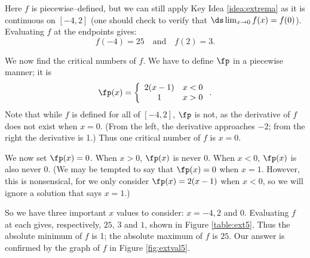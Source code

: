 {Here $f$ is piecewise--defined, but we can still apply Key Idea \ref{idea:extrema} as it is continuous on $[-4,2]$ (one should check to verify that $\ds\lim_{x\to0}f(x) =f(0)$). Evaluating $f$ at the endpoints gives: 
$$ f(-4) = 25 \quad \text{and} \quad f(2) = 3.$$

We now find the critical numbers of $f$. We have to define $\fp$ in a piecewise manner; it is $$\fp(x) =\left\{\begin{array}{cc} 2(x-1) & x < 0 \\ 1 & x>0 \end{array}\right. .$$ Note that while $f$ is defined for all of $[-4,2]$, $\fp$ is not, as the derivative of $f$ does not exist when $x=0$. (From the left, the derivative approaches $-2$; from the right the derivative is 1.) Thus one critical number of $f$ is $x=0$.

We now set $\fp(x) = 0$. When $x >0$, $\fp(x)$ is never 0.  When $x<0$, $\fp(x)$ is also never 0. (We may be tempted to say that $\fp(x) = 0 $ when $x=1$. However, this is nonsensical, for we only consider $\fp(x) = 2(x-1)$ when $x<0$, so we will ignore a solution that says $x=1$.) 

So we have three important $x$ values to consider: $x= -4, 2$ and $0$. Evaluating $f$ at each gives, respectively, $25$, $3$ and $1$, shown in Figure \ref{table:ext5}. Thus the absolute minimum of $f$ is 1; the absolute maximum of $f$ is $25$. Our answer is confirmed by the graph of $f$ in Figure \ref{fig:extval5}.
}\\
\clearpage
{}
